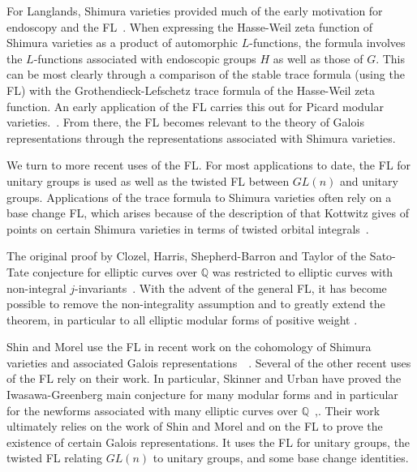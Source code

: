 \documentclass[brochure,english,12pt]{bourbaki}
\newcommand{\ring}[1]{\mathbb{#1}}
\begin{document}
For Langlands, Shimura varieties provided much of the early motivation
for endoscopy and the FL~\cite{LZ:1979}.  When expressing the 
Hasse-Weil zeta function of Shimura varieties as a product of
automorphic $L$-functions, the formula involves the $L$-functions
associated with endoscopic groups $H$ as well as those of $G$.  This
can be most clearly through a comparison of the stable trace formula (using the FL)
with the Grothendieck-Lefschetz trace formula of the Hasse-Weil zeta
function.
An early application of the FL carries this out for
Picard modular
varieties.~\cite{LPicard:1992}.  From there, the FL becomes relevant to the theory of Galois representations
through the representations associated with Shimura varieties.

We turn to more recent uses of the FL.  
For most applications to
date, the FL for unitary groups is used as well as the twisted FL
between $GL(n)$ and unitary groups.  Applications of the trace formula
to Shimura varieties often rely on a base change FL, which  arises
because of the description of that Kottwitz gives of points on certain
Shimura varieties in terms of twisted orbital
integrals~\cite{Kott:1990}.


The original proof by Clozel, Harris, Shepherd-Barron and Taylor
of the Sato-Tate conjecture for elliptic curves over
$\ring{Q}$ was restricted to elliptic curves with non-integral
$j$-invariants~\cite{Car:Bourbaki}.
With the advent of the general FL, it has become possible to remove
the non-integrality assumption and to greatly extend the theorem, in particular 
to all elliptic modular forms of positive weight \cite{BGHT:2010}.




Shin and Morel use the FL in recent work on the cohomology of
Shimura varieties and associated Galois
representations~\cite{Shin:2010}~\cite{Morel:2010}.  Several of the
other recent uses of the FL rely on their work.  In particular,
Skinner and Urban have proved the Iwasawa-Greenberg main conjecture
for many modular forms and in particular for the newforms associated
with many elliptic curves over
$\ring{Q}$~\cite{Skinner-Urban:2010},\cite{Skinner:2010}.  Their work
ultimately relies on the work of Shin and Morel and on the FL to prove
the existence of certain Galois representations.  It uses the FL for
unitary groups, the twisted FL relating $GL(n)$ to unitary groups, and
some base change identities.
\end{document}

